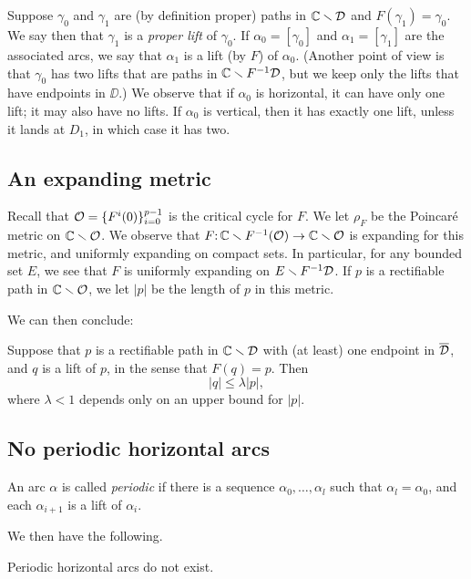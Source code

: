Suppose $\gamma_0$ and $\gamma_1$ are (by definition proper) paths in ${\Bbb C} \smallsetminus {\mathcal D}$ and $F(\gamma_1) = \gamma_0$.
We say then that $\gamma_1$ is a \emph{proper lift} of $\gamma_0$.
If $\alpha_0 = [\gamma_0]$ and $\alpha_1 = [\gamma_1]$ are the associated arcs,
we say that $\alpha_1$ is a lift (by $F$) of $\alpha_0$. 
(Another point of view is that $\gamma_0$ has two lifts that are paths in ${\Bbb C} \smallsetminus F^{-1}{\mathcal D}$,
but we keep only the lifts that have endpoints in  $\DD$.)
We observe that if $\alpha_0$ is horizontal, it can have only one lift; it may also have no lifts. 
If $\alpha_0$ is vertical, 
then it has exactly one lift, 
unless it lands at $D_1$, 
in which case it has two. 


\subsection{An expanding metric}
Recall that ${\mathcal O} = \{ F^i(0)\}_{i = 0}^{p-1}$ is the critical cycle for $F$.
We let $\rho_F$ be the Poincar\'e metric on ${\Bbb C} \smallsetminus {\mathcal O}$.
We observe that $F\mathpunct: {\Bbb C} \smallsetminus F^{-1}({\mathcal O}) \to {\Bbb C} \smallsetminus {\mathcal O}$ is expanding for this metric,
and uniformly expanding on compact sets.
In particular,
for any bounded set $E$,
we see that $F$ is uniformly expanding on $E \smallsetminus F^{-1} {\mathcal D}$. 
If $p$ is a rectifiable path in ${\Bbb C} \smallsetminus {\mathcal O}$,
we let $|p|$ be the length of $p$ in this metric. 

We can then conclude:
\begin{lemma} \label{lem:contract-lifts}
Suppose that $p$ is a rectifiable path in ${\Bbb C} \smallsetminus {\mathcal D}$ with (at least) one endpoint in $\overline{{\mathcal D}}$,
and $q$ is a lift of $p$, in the sense that $F(q) = p$.
Then 
\begin{equation}
|q| \le \lambda |p|,
\end{equation}
where $\lambda < 1$ depends only on an upper bound for $|p|$. 
\end{lemma}

\subsection{No periodic horizontal arcs}
An arc $\alpha$ is called {\it periodic} if there is a sequence $\alpha_0, \ldots, \alpha_l$ such that $\alpha_l = \alpha_0$,
and each $\alpha_{i+1}$ is a lift of $\alpha_i$. 

We then have the following. 
\begin{lem}\label{no inv hor arcs}
 Periodic horizontal arcs do not exist.
\end{lem}

